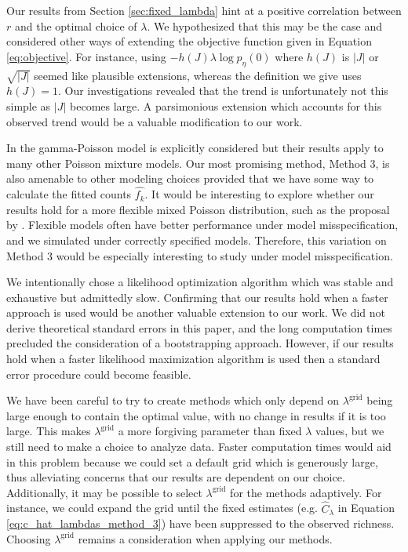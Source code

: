 \documentclass[oupdraft]{bio}
\newcommand{\lambdagrid}{\lambda^{\text{grid}}}
\begin{document}
Our results from Section \ref{sec:fixed_lambda} hint at a positive correlation between $r$ and the optimal choice of $\lambda$.  We hypothesized that this may be the case and considered other ways of extending the objective function given in Equation \ref{eq:objective}.  For instance, using $-h(J)\lambda \log p_{\eta}(0)$ where $h(J)$ is $|J|$ or $\sqrt{|J|}$ seemed like plausible extensions, whereas the definition we give uses $h(J) = 1$.  Our investigations revealed that the trend is unfortunately not this simple as $|J|$ becomes large.  A parsimonious extension which accounts for this observed trend would be a valuable modification to our work.

In \citet{wang_2005} the gamma-Poisson model is explicitly considered but their results apply to many other Poisson mixture models.  Our most promising method, Method 3, is also amenable to other modeling choices provided that we have some way to calculate the fitted counts $\widehat{f_k}$.  It would be interesting to explore whether our results hold for a more flexible mixed Poisson distribution, such as the proposal by \citet{norris_1998}.  Flexible models often have better performance under model misspecification, and we simulated under correctly specified models.  Therefore, this variation on  Method 3 would be especially interesting to study under model misspecification.

We intentionally chose a likelihood optimization algorithm which was stable and exhaustive but admittedly slow.  Confirming that our results hold when a faster approach is used would be another valuable extension to our work. We did not derive theoretical standard errors in this paper, and the long computation times precluded the consideration of a bootstrapping approach.  However, if our results hold when a faster likelihood maximization algorithm is used then a standard error procedure could become feasible.

We have been careful to try to create methods which only depend on $\lambdagrid$ being large enough to contain the optimal value, with no change in results if it is too large.  This makes $\lambdagrid$ a more forgiving parameter than fixed $\lambda$ values, but we still need to make a choice to analyze data.  Faster computation times would aid in this problem because we could set a default grid which is generously large, thus alleviating concerns that our results are dependent on our choice.  Additionally, it may be possible to select $\lambdagrid$ for the methods adaptively.  For instance, we could expand the grid until the fixed estimates (e.g. $\widehat{C}_{\lambda}$ in Equation \ref{eq:c_hat_lambdas_method_3}) have been suppressed to the observed richness.  Choosing $\lambdagrid$ remains a consideration when applying our methods.
\end{document}
